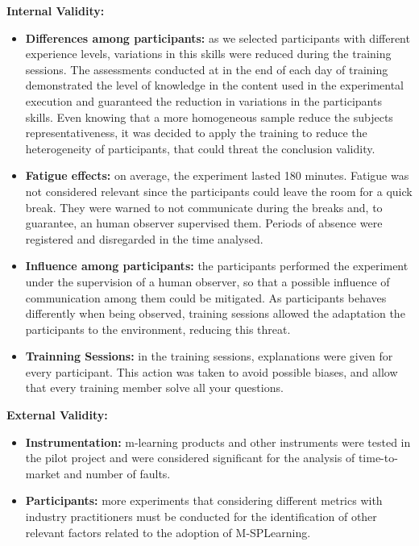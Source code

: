 \vspace{5pt}

\textbf{Internal Validity:}

\begin{itemize}
\item \textbf{Differences among participants:} as we selected participants with different experience levels, variations in this skills were reduced during the training sessions. The assessments conducted at in the end of each day of training demonstrated the level of knowledge in the content used in the experimental execution and guaranteed the reduction in variations in the participants skills. Even knowing that a more homogeneous sample reduce the subjects representativeness, it was decided to apply the training to reduce the heterogeneity of participants, that could threat the conclusion validity.

\item \textbf{Fatigue effects:} on average, the experiment lasted 180 minutes. Fatigue was not considered relevant since the participants could leave the room for a quick break. They were warned to not communicate during the breaks and, to guarantee, an human observer supervised them. Periods of absence were registered and disregarded in the time analysed.

\item \textbf{Influence among participants:} the participants performed the experiment under the supervision of a human observer, so that a possible influence of communication among them could be mitigated. As participants behaves differently when being observed, training sessions allowed the adaptation the participants to the environment, reducing this threat.

\item \textbf{Trainning Sessions:} in the training sessions, explanations were given for every participant. This action was taken to avoid possible biases, and allow that every training member solve all your questions.
\end{itemize}

\textbf{External Validity:}

\begin{itemize}

\item \textbf{Instrumentation:} m-learning products and other instruments were tested in the pilot project and were considered significant for the analysis of time-to-market and number of faults.

\item \textbf{Participants:} more experiments that considering different metrics with industry practitioners must be conducted for the identification of other relevant factors related to the adoption of M-SPLear\allowbreak ning.

\end{itemize}

